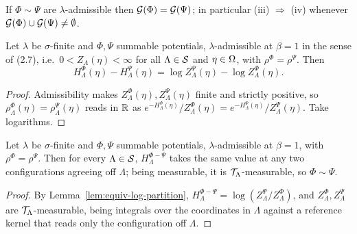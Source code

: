 \begin{corollary}
    \label{cor:equiv-gibbs-eq}

    If $\Phi \sim \Psi$ are $\lambda$-admissible then $\mathcal{G}(\Phi) = \mathcal{G}(\Psi)$; in
    particular (iii) $\Rightarrow$ (iv) whenever $\mathcal{G}(\Phi) \cup \mathcal{G}(\Psi) \neq \emptyset$.
\end{corollary}

\begin{lemma}
    \label{lem:equiv-log-partition}
    \leanok

    Let $\lambda$ be $\sigma$-finite and $\Phi, \Psi$ summable potentials, $\lambda$-admissible
    at $\beta = 1$ in the sense of (2.7), i.e.\ $0 < Z_\Lambda(\eta) < \infty$ for all
    $\Lambda \in \mathcal{S}$ and $\eta \in \Omega$, with $\rho^\Phi = \rho^\Psi$. Then
    \[ H_\Lambda^{\Phi}(\eta) - H_\Lambda^{\Psi}(\eta)
        = \log Z_\Lambda^{\Psi}(\eta) - \log Z_\Lambda^{\Phi}(\eta). \]
\end{lemma}
\begin{proof}
    \leanok

    Admissibility makes $Z_\Lambda^\Phi(\eta), Z_\Lambda^\Psi(\eta)$ finite and strictly
    positive, so $\rho_\Lambda^\Phi(\eta) = \rho_\Lambda^\Psi(\eta)$ reads in $\mathbb{R}$ as
    $e^{-H_\Lambda^\Phi(\eta)}/Z_\Lambda^\Phi(\eta) =
    e^{-H_\Lambda^\Psi(\eta)}/Z_\Lambda^\Psi(\eta)$. Take logarithms.
\end{proof}

\begin{theorem}
    \label{thm:equiv-of-density-eq}
    \leanok

    Let $\lambda$ be $\sigma$-finite and $\Phi, \Psi$ summable potentials, $\lambda$-admissible
    at $\beta = 1$, with $\rho^\Phi = \rho^\Psi$. Then for every $\Lambda \in \mathcal{S}$,
    $H_\Lambda^{\Phi - \Psi}$ takes the same value at any two configurations agreeing off
    $\Lambda$; being measurable, it is $\mathcal{T}_\Lambda$-measurable, so $\Phi \sim \Psi$.
\end{theorem}
\begin{proof}
    \leanok

    By Lemma~\ref{lem:equiv-log-partition}, $H_\Lambda^{\Phi-\Psi} = \log(Z_\Lambda^\Psi /
    Z_\Lambda^\Phi)$, and $Z_\Lambda^\Phi, Z_\Lambda^\Psi$ are $\mathcal{T}_\Lambda$-measurable,
    being integrals over the coordinates in $\Lambda$ against a reference kernel that reads only
    the configuration off $\Lambda$.
\end{proof}

